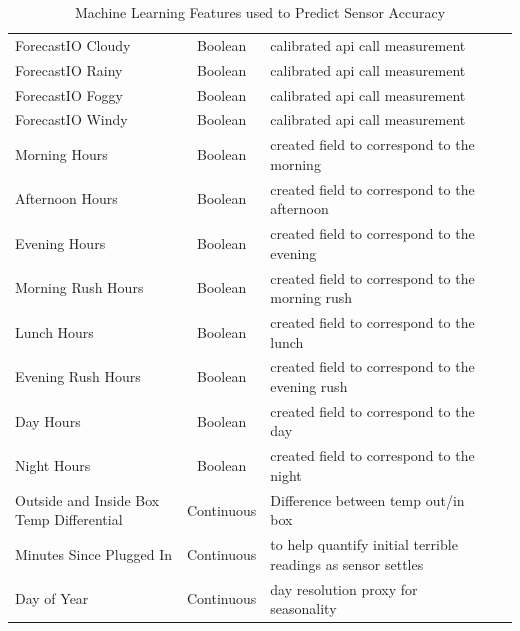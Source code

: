 \begin{table}[H]
\begin{tabular}{lclc|c|}
ForecastIO Cloudy & Boolean & calibrated api call measurement \\
ForecastIO Rainy & Boolean & calibrated api call measurement \\
ForecastIO Foggy & Boolean & calibrated api call measurement \\
ForecastIO Windy & Boolean & calibrated api call measurement \\
Morning Hours & Boolean & created field to correspond to the morning \\
Afternoon Hours & Boolean & created field to correspond to the afternoon \\
Evening Hours & Boolean & created field to correspond to the evening \\
Morning Rush Hours & Boolean & created field to correspond to the morning rush \\
Lunch Hours & Boolean & created field to correspond to the lunch \\
Evening Rush Hours & Boolean & created field to correspond to the evening rush \\
Day Hours & Boolean & created field to correspond to the day \\
Night Hours & Boolean & created field to correspond to the night \\
Outside and Inside Box Temp Differential & Continuous & Difference between temp out/in box \\
Minutes Since Plugged In & Continuous & to help quantify initial terrible readings as sensor settles \\
Day of Year & Continuous & day resolution proxy for seasonality \\
\bottomrule
\end{tabular}
\label{tab:feature_table}
\caption{Machine Learning Features used to Predict Sensor Accuracy}
\end{table}


